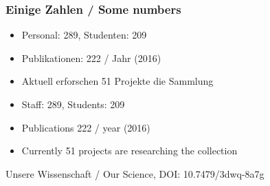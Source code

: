 \documentclass[13pt]{beamer}
\begin{document}
\begin{frame}
  \frametitle{ Einige Zahlen / \textcolor{mfn_green}{Some numbers}}

  \begin{itemize}
  \item{Personal: 289, Studenten: 209}
  \item{Publikationen: 222 / Jahr (2016)}
  \item{Aktuell erforschen 51 Projekte die Sammlung}
  \end{itemize}
  
  \begin{itemize}
  \item{\textcolor{mfn_green}{Staff: 289, Students: 209}}
  \item{\textcolor{mfn_green}{Publications 222 / year (2016)}}
  \item{\textcolor{mfn_green}{Currently 51 projects are researching the collection}}
  \end{itemize}
  \bigskip
  \begin{center}\tiny{Unsere Wissenschaft / Our Science, DOI: 10.7479/3dwq-8a7g}\end{center}
\end{frame}
\end{document}
